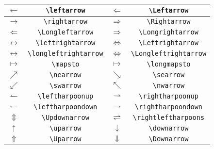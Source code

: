 \documentclass[a4paper,12pt]{standalone}
\begin{document}
\begin{tabular}{cccc} \toprule
    \(\leftarrow\)          & \verb|\leftarrow|  & \(\Leftarrow\)          & \verb|\Leftarrow|  \\ \midrule
    \(\rightarrow\)         & \verb|\rightarrow|  & \(\Rightarrow\)         & \verb|\Rightarrow|  \\ \midrule

    \(\Longleftarrow\)      & \verb|\Longleftarrow|  & \(\Longrightarrow\)     & \verb|\Longrightarrow|  \\ \midrule
    \(\leftrightarrow\)     & \verb|\leftrightarrow|  & \(\Leftrightarrow\)     & \verb|\Leftrightarrow|  \\ \midrule
    \(\longleftrightarrow\) & \verb|\longleftrightarrow|  & \(\Longleftrightarrow\) & \verb|\Longleftrightarrow| \\ \midrule
    \(\mapsto\)             & \verb|\mapsto| & \(\longmapsto\)         & \verb|\longmapsto| \\ \midrule
    \(\nearrow\)            & \verb|\nearrow| & \(\searrow\)            & \verb|\searrow| \\ \midrule
    \(\swarrow\)            & \verb|\swarrow| & \(\nwarrow\)            & \verb|\nwarrow| \\ \midrule
    \(\leftharpoonup\)      & \verb|\leftharpoonup| & \(\rightharpoonup\)     & \verb|\rightharpoonup| \\ \midrule
    \(\leftharpoondown\)    & \verb|\leftharpoondown| & \(\rightharpoondown\)   & \verb|\rightharpoondown| \\ \midrule
    \(\Updownarrow\)        & \verb|\Updownarrow| & \(\rightleftharpoons\)  & \verb|\rightleftharpoons| \\ \midrule
    \(\uparrow\)            & \verb|\uparrow| & \(\downarrow\)          & \verb|\downarrow| \\ \midrule
    \(\Uparrow\)            & \verb|\Uparrow| & \(\Downarrow\)          & \verb|\Downarrow| \\ \midrule
\end{tabular}
\end{document}
